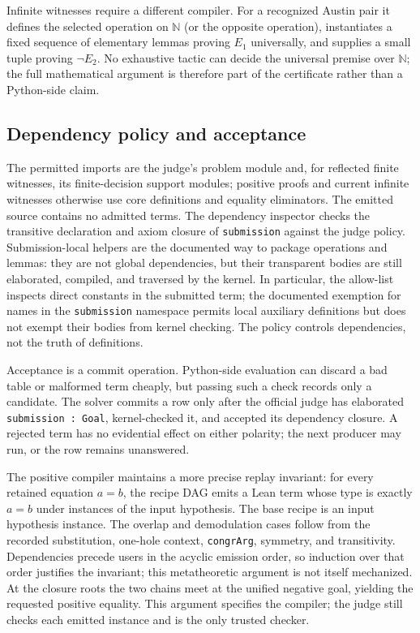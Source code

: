 \documentclass[10pt,twocolumn]{article}
\newcommand{\Nat}{\mathbb{N}}
\newcommand{\code}[1]{\texttt{#1}}
\begin{document}
Infinite witnesses require a different compiler.  For a recognized Austin
pair it defines the selected operation on $\Nat$ (or the opposite operation),
instantiates a fixed sequence of elementary lemmas proving $E_1$ universally,
and supplies a small tuple proving $\neg E_2$.  No exhaustive tactic can decide
the universal premise over $\Nat$; the full mathematical argument is therefore
part of the certificate rather than a Python-side claim.

\subsection{Dependency policy and acceptance}

The permitted imports are the judge's problem module and, for reflected finite
witnesses, its finite-decision support modules; positive proofs and current
infinite witnesses otherwise use core definitions and equality eliminators.
The emitted source contains no admitted terms.  The dependency inspector
checks the transitive declaration and axiom closure of \code{submission}
against the judge policy.  Submission-local helpers are the documented way to
package operations and lemmas: they are not global dependencies, but their
transparent bodies are still elaborated, compiled, and traversed by the kernel.
In particular, the allow-list inspects direct constants in the submitted term;
the documented exemption for names in the \code{submission} namespace permits
local auxiliary definitions but does not exempt their bodies from kernel
checking.  The policy controls dependencies, not the truth of definitions.

Acceptance is a commit operation.  Python-side evaluation can discard a bad
table or malformed term cheaply, but passing such a check records only a
candidate.  The solver commits a row only after the official judge has
elaborated \code{submission : Goal}, kernel-checked it, and accepted its
dependency closure.  A rejected term has no evidential effect on either
polarity; the next producer may run, or the row remains unanswered.

The positive compiler maintains a more precise replay invariant: for every
retained equation $a=b$, the recipe DAG emits a Lean term whose type is exactly
$a=b$ under instances of the input hypothesis.  The base recipe is an input
hypothesis instance.  The overlap and demodulation cases follow from the
recorded substitution, one-hole context, \code{congrArg}, symmetry, and
transitivity.  Dependencies precede users in the acyclic emission order, so induction over
that order justifies the invariant; this metatheoretic argument is not itself
mechanized.  At the closure roots the two
chains meet at the unified negative goal, yielding the requested positive
equality.  This argument specifies the compiler; the judge still checks each
emitted instance and is the only trusted checker.
\end{document}
